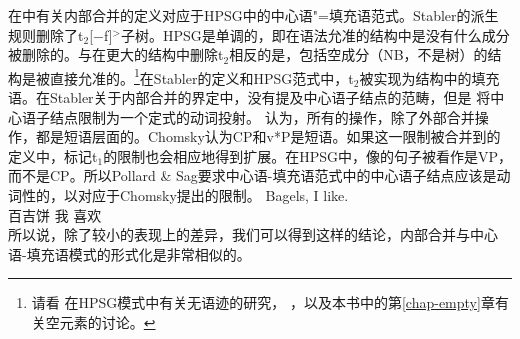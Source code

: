 在中有关内部合并的定义对应于HPSG中的中心语"=填充语范式\citep[]{ps2}。Stabler的派生规则删除了t$_2$[$-$f]$^>$子树。HPSG是单调的，即在语法允准的结构中是没有什么成分被删除的。与在更大的结构中删除t$_2$相反的是，包括空成分（NB，不是树）的结构是被直接允准的。\footnote{%
请看 在HPSG模式中有关无语迹的研究， ，以及本书中的第\ref{chap-empty}章有关空元素的讨论。
}在Stabler的定义和HPSG范式中，t$_2$被实现为结构中的填充语。在Stabler关于内部合并的界定中，没有提及中心语子结点的范畴，但是 \citet[]{ps2}将中心语子结点限制为一个定式的动词投射。 \citet[]{Chomsky2007a}认为，所有的操作，除了外部合并操作，都是短语层面的。Chomsky认为CP和v*P是短语。如果这一限制被合并到的定义中，标记t$_1$的限制也会相应地得到扩展。在HPSG中，像的句子被看作是VP，而不是CP。所以Pollard \& Sag要求中心语-填充语范式中的中心语子结点应该是动词性的，以对应于Chomsky提出的限制。
\ea
\gll Bagels, I like.\\
百吉饼 我 喜欢\\
\z
所以说，除了较小的表现上的差异，我们可以得到这样的结论，内部合并与中心语-填充语模式的形式化是非常相似的。

